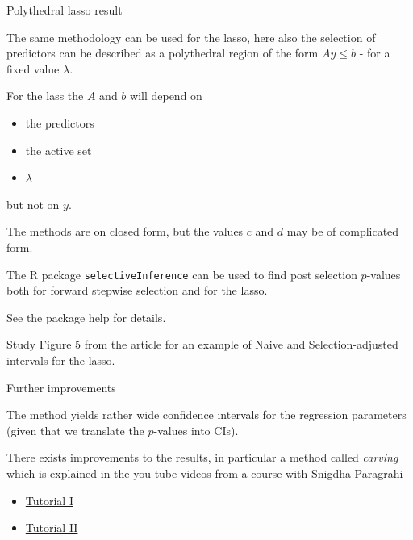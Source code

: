 \documentclass[
  ignorenonframetext,
]{beamer}
\providecommand{\tightlist}{%
  \setlength{\itemsep}{0pt}\setlength{\parskip}{0pt}}
\begin{document}
\begin{frame}

\begin{block}{Polythedral lasso result}

The same methodology can be used for the lasso, here also the selection
of predictors can be described as a polythedral region of the form
\(Ay\le b\) - for a fixed value \(\lambda\).

For the lass the \(A\) and \(b\) will depend on

\begin{itemize}
\tightlist
\item
  the predictors
\item
  the active set
\item
  \(\lambda\)
\end{itemize}

but not on \(y\).

The methods are on closed form, but the values \(c\) and \(d\) may be of
complicated form.

\end{block}

\end{frame}

\begin{frame}[fragile]

The R package \texttt{selectiveInference} can be used to find post
selection \(p\)-values both for forward stepwise selection and for the
lasso.

See the package help for details.

Study Figure 5 from the article for an example of Naive and
Selection-adjusted intervals for the lasso.

\end{frame}

\begin{frame}

\begin{block}{Further improvements}

The method yields rather wide confidence intervals for the regression
parameters (given that we translate the \(p\)-values into CIs).

There exists improvements to the results, in particular a method called
\emph{carving} which is explained in the you-tube videos from a course
with
\href{https://lsa.umich.edu/stats/people/faculty/psnigdha.html}{Snigdha
Paragrahi}

\begin{itemize}
\tightlist
\item
  \href{https://www.youtube.com/watch?v=qofrkW-DL7c\&t=3682s}{Tutorial
  I}
\item
  \href{https://www.youtube.com/watch?v=rGHf6BPeqBg\&t=1105s}{Tutorial
  II}
\end{itemize}

\end{block}

\end{frame}
\end{document}
